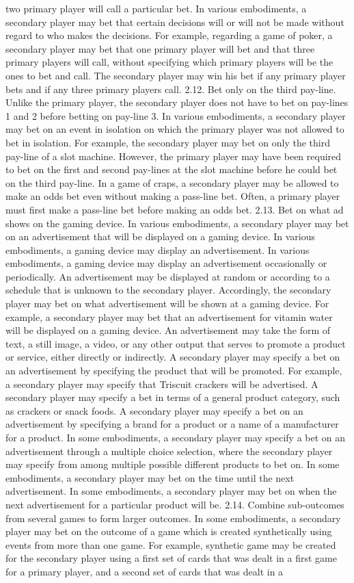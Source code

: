 \documentclass[11pt,a4paper]{article}
\begin{document}
two primary player will call a particular bet. In various embodiments, a secondary player may bet that certain decisions will or will not be made without regard to who makes the decisions. For example, regarding a game of poker, a secondary player may bet that one primary player will bet and that three primary players will call, without specifying which primary players will be the ones to bet and call. The secondary player may win his bet if any primary player bets and if any three primary players call. 2.12. Bet only on the third pay-line. Unlike the primary player, the secondary player does not have to bet on pay-lines 1 and 2 before betting on pay-line 3. In various embodiments, a secondary player may bet on an event in isolation on which the primary player was not allowed to bet in isolation. For example, the secondary player may bet on only the third pay-line of a slot machine. However, the primary player may have been required to bet on the first and second pay-lines at the slot machine before he could bet on the third pay-line. In a game of craps, a secondary player may be allowed to make an odds bet even without making a pass-line bet. Often, a primary player must first make a pass-line bet before making an odds bet. 2.13. Bet on what ad shows on the gaming device. In various embodiments, a secondary player may bet on an advertisement that will be displayed on a gaming device. In various embodiments, a gaming device may display an advertisement. In various embodiments, a gaming device may display an advertisement occasionally or periodically. An advertisement may be displayed at random or according to a schedule that is unknown to the secondary player. Accordingly, the secondary player may bet on what advertisement will be shown at a gaming device. For example, a secondary player may bet that an advertisement for vitamin water will be displayed on a gaming device. An advertisement may take the form of text, a still image, a video, or any other output that serves to promote a product or service, either directly or indirectly. A secondary player may specify a bet on an advertisement by specifying the product that will be promoted. For example, a secondary player may specify that Triscuit crackers will be advertised. A secondary player may specify a bet in terms of a general product category, such as crackers or snack foods. A secondary player may specify a bet on an advertisement by specifying a brand for a product or a name of a manufacturer for a product. In some embodiments, a secondary player may specify a bet on an advertisement through a multiple choice selection, where the secondary player may specify from among multiple possible different products to bet on. In some embodiments, a secondary player may bet on the time until the next advertisement. In some embodiments, a secondary player may bet on when the next advertisement for a particular product will be. 2.14. Combine sub-outcomes from several games to form larger outcomes. In some embodiments, a secondary player may bet on the outcome of a game which is created synthetically using events from more than one game. For example, synthetic game may be created for the secondary player using a first set of cards that was dealt in a first game for a primary player, and a second set of cards that was dealt in a 
\end{document}
